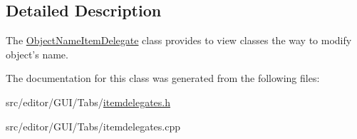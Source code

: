 \subsection{\-Detailed \-Description}
\-The \hyperlink{class_object_name_item_delegate}{\-Object\-Name\-Item\-Delegate} class provides to view classes the way to modify object's name. 

\-The documentation for this class was generated from the following files\-:\begin{DoxyCompactItemize}
\item 
src/editor/\-G\-U\-I/\-Tabs/\hyperlink{itemdelegates_8h}{itemdelegates.\-h}\item 
src/editor/\-G\-U\-I/\-Tabs/itemdelegates.\-cpp\end{DoxyCompactItemize}
